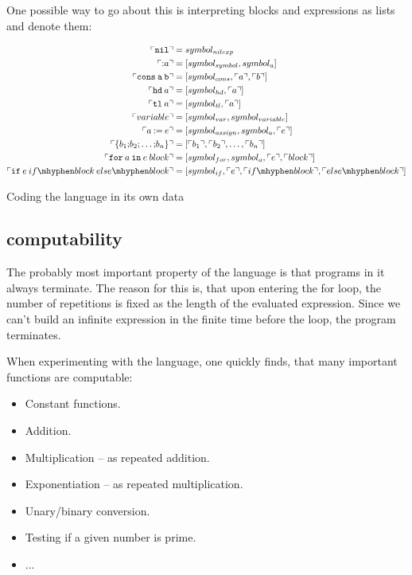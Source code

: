 One possible way to go about this is interpreting blocks and expressions as lists and denote them:
\begin{table}
\begin{align*}
	\coded{\mathtt{nil}} &= symbol_{nilexp}\\
	\coded{\mathtt{:}a} &= [symbol_{symbol}, symbol_a] \\
	\coded{\mathtt{cons\: a\: b }} &= [symbol_{cons}, \coded{a}, \coded{b}]\\
	\coded{\mathtt{hd}\: a} &= [symbol_{hd}, \coded{a}]\\
	\coded{\mathtt{tl}\: a} &= [symbol_{tl}, \coded{a}]\\
	\coded{variable} &= [symbol_{var}, symbol_{variable}] \\
	\coded{a\: \mathtt{:=}\: e} &= [symbol_{assign}, symbol_a, \coded{e}]\\
	\coded{\mathtt{\{ } b_1 \mathtt{;} b_2 \mathtt{;} \dots \mathtt{;} b_n \mathtt{\} }} &= [\coded{b_1}, \coded{b_2}, \dots, \coded{b_n}]\\
	\coded{\mathtt{for}\: a\: \mathtt{in}\: e\: block} &= [symbol_{for}, symbol_a, \coded{e}, \coded{block}]\\
	\coded{\mathtt{if}\: e\: if\mhyphen block\: else\mhyphen block} &= [symbol_{if}, \coded{e}, \coded{if\mhyphen block}, \coded{else\mhyphen block}]
\end{align*}
\caption{Coding the \FOR language in its own data}
\end{table} 
\subsection{\FOR computability}
The probably most important property of the \FOR language is that programs in 
it always terminate. The reason for this is, that upon entering the for loop, 
the number of repetitions is fixed as the length of the evaluated expression. 
Since we can't build an infinite expression in the finite time before the 
loop, the program terminates.

When experimenting with the language, one quickly finds, that many important 
functions are \FOR computable:

\begin{itemize}
	\item Constant functions.
	\item Addition.
	\item Multiplication -- as repeated addition.
	\item Exponentiation -- as repeated multiplication.
	\item Unary/binary conversion.
	\item Testing if a given number is prime.
	\item ...
\end{itemize}

